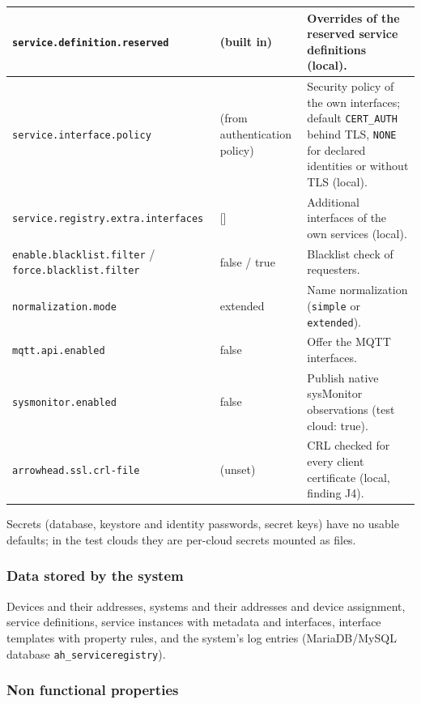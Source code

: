 \documentclass[a4paper]{arrowhead}
\begin{document}
\begin{longtable}{| p{5.4cm} | p{3.4cm} | p{6.4cm} |}
\texttt{service.\allowbreak{}definition.\allowbreak{}reserved} & (built in) & Overrides of the reserved service definitions (local). \\ \hline
\texttt{service.\allowbreak{}interface.\allowbreak{}policy} & (from authentication policy) & Security policy of the own interfaces; default \texttt{CERT\_\allowbreak{}AUTH} behind TLS, \texttt{NONE} for declared identities or without TLS (local). \\ \hline
\texttt{service.\allowbreak{}registry.\allowbreak{}extra.\allowbreak{}interfaces} & [] & Additional interfaces of the own services (local). \\ \hline
\texttt{enable.\allowbreak{}blacklist.\allowbreak{}filter} / \texttt{force.\allowbreak{}blacklist.\allowbreak{}filter} & false / true & Blacklist check of requesters. \\ \hline
\texttt{normalization.\allowbreak{}mode} & extended & Name normalization (\texttt{simple} or \texttt{extended}). \\ \hline
\texttt{mqtt.\allowbreak{}api.\allowbreak{}enabled} & false & Offer the MQTT interfaces. \\ \hline
\texttt{sysmonitor.\allowbreak{}enabled} & false & Publish native sysMonitor observations (test cloud: true). \\ \hline
\texttt{arrowhead.\allowbreak{}ssl.\allowbreak{}crl-\allowbreak{}file} & (unset) & CRL checked for every client certificate (local, finding J4). \\ \hline
\end{longtable}

Secrets (database, keystore and identity passwords, secret keys) have no usable defaults; in the test clouds they are per-cloud secrets mounted as files.

\subsubsection{Data stored by the system}

Devices and their addresses, systems and their addresses and device assignment, service definitions, service instances with metadata and interfaces, interface templates with property rules, and the system's log entries (MariaDB/MySQL database \texttt{ah\_\allowbreak{}serviceregistry}).

\subsubsection{Non functional properties}
\end{document}
